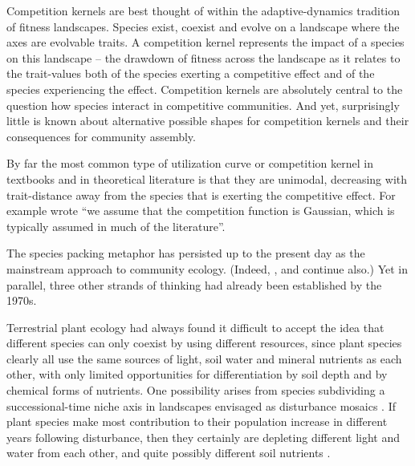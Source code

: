 \documentclass[a4paper,11pt]{article}
\begin{document}
Competition kernels are best thought of within the adaptive-dynamics tradition of fitness landscapes. Species exist, coexist and evolve on a landscape where the axes are evolvable traits. A competition kernel represents the impact of a species on this landscape -- the drawdown of fitness across the landscape as it relates to the trait-values both of the species exerting a competitive effect and of the species experiencing the effect. Competition kernels are absolutely central to the question how species interact in competitive communities. And yet, surprisingly little is known about alternative possible shapes for competition kernels and their consequences for community assembly.

By far the most common type of utilization curve or competition kernel in textbooks
and in theoretical literature is that they are unimodal, decreasing with trait-distance away from the species that is exerting the competitive effect. For example \citep{Birand-2014} wrote ``we assume that the competition function is Gaussian, which is typically assumed in much of the literature''.

The species packing metaphor has persisted up to the present day as the mainstream approach to community ecology. (Indeed,  \citet{Krebs-2013}, \citet{Ricklefs-1999} and \citet{Pianka-1999} continue also.) Yet in parallel, three other strands of thinking had already been established by the 1970s.

Terrestrial plant ecology had always found it difficult to accept the idea that
different species can only coexist by using different resources, since plant species
clearly all use the same sources of light, soil water and mineral nutrients as
each other, with only limited opportunities for differentiation by soil depth
and by chemical forms of nutrients. One possibility arises from species subdividing
a successional-time niche axis in landscapes envisaged as disturbance mosaics
\citep{Connell-1978}. If plant species make most contribution to their population
increase in different years following disturbance, then they certainly are depleting
different light and water from each other, and quite possibly different soil nutrients
\citep{Moorcroft-2001}.
\end{document}
